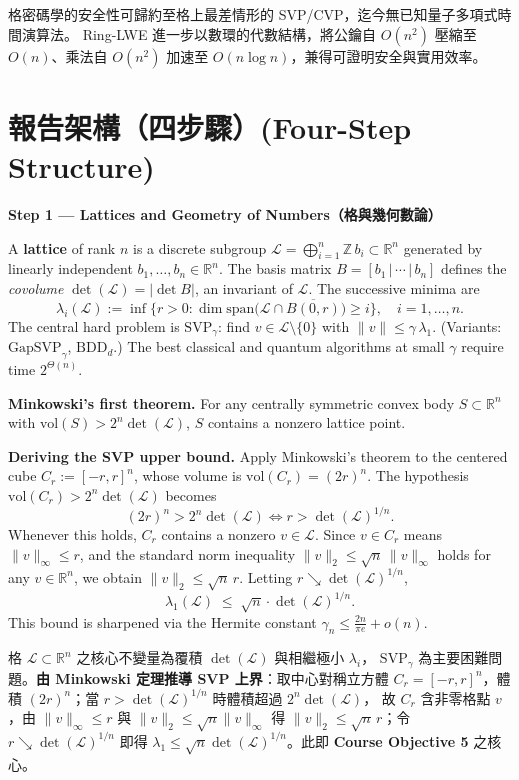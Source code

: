 \documentclass[12pt, a4paper]{article}
\begin{document}
格密碼學的安全性可歸約至格上最差情形的 SVP/CVP，迄今無已知量子多項式時間演算法。
Ring-LWE 進一步以數環的代數結構，將公鑰自 $O(n^2)$ 壓縮至 $O(n)$、乘法自 $O(n^2)$
加速至 $O(n\log n)$，兼得可證明安全與實用效率。

\section{報告架構（四步驟）\small\normalfont\color{gray}(Four-Step Structure)}

\textbf{Step 1 --- Lattices and Geometry of Numbers（格與幾何數論）}

A \textbf{lattice} of rank $n$ is a discrete subgroup
$\mathcal{L} = \bigoplus_{i=1}^{n}\mathbb{Z}\,b_i \subset \mathbb{R}^n$
generated by linearly independent $b_1,\ldots,b_n\in\mathbb{R}^n$. The basis matrix
$B=[b_1\,|\,\cdots\,|\,b_n]$ defines the \textit{covolume} $\det(\mathcal{L})=|\det B|$,
an invariant of $\mathcal{L}$. The successive minima are
\[
  \lambda_i(\mathcal{L}) := \inf\bigl\{r>0 : \dim\mathrm{span}\bigl(\mathcal{L}\cap\overline{B(0,r)}\bigr)\geq i\bigr\}, \quad i=1,\ldots,n.
\]
The central hard problem is $\mathrm{SVP}_\gamma$: find $v\in\mathcal{L}\setminus\{0\}$ with
$\|v\|\leq\gamma\,\lambda_1$. (Variants: $\mathrm{GapSVP}_\gamma$, $\mathrm{BDD}_d$.) The best
classical and quantum algorithms at small $\gamma$ require time $2^{\Theta(n)}$.

\textbf{Minkowski's first theorem.} For any centrally symmetric convex body $S\subset\mathbb{R}^n$
with $\mathrm{vol}(S)>2^n\det(\mathcal{L})$, $S$ contains a nonzero lattice point.

\textbf{Deriving the SVP upper bound.} Apply Minkowski's theorem to the centered cube
$C_r := [-r,r]^n$, whose volume is $\mathrm{vol}(C_r)=(2r)^n$. The hypothesis
$\mathrm{vol}(C_r)>2^n\det(\mathcal{L})$ becomes
\[
  (2r)^n > 2^n\det(\mathcal{L}) \iff r > \det(\mathcal{L})^{1/n}.
\]
Whenever this holds, $C_r$ contains a nonzero $v\in\mathcal{L}$. Since $v\in C_r$ means
$\|v\|_\infty\leq r$, and the standard norm inequality $\|v\|_2\leq\sqrt{n}\,\|v\|_\infty$ holds
for any $v\in\mathbb{R}^n$, we obtain $\|v\|_2\leq\sqrt{n}\,r$. Letting
$r\searrow\det(\mathcal{L})^{1/n}$,
\[
  \boxed{\ \lambda_1(\mathcal{L}) \;\leq\; \sqrt{n}\cdot\det(\mathcal{L})^{1/n}.\ }
\]
This bound is sharpened via the Hermite constant $\gamma_n\leq\tfrac{2n}{\pi e}+o(n)$.

格 $\mathcal{L}\subset\mathbb{R}^n$ 之核心不變量為覆積 $\det(\mathcal{L})$ 與相繼極小 $\lambda_i$，
$\mathrm{SVP}_\gamma$ 為主要困難問題。\textbf{由 Minkowski 定理推導 SVP 上界}：取中心對稱立方體
$C_r=[-r,r]^n$，體積 $(2r)^n$；當 $r>\det(\mathcal{L})^{1/n}$ 時體積超過 $2^n\det(\mathcal{L})$，
故 $C_r$ 含非零格點 $v$，由 $\|v\|_\infty\leq r$ 與 $\|v\|_2\leq\sqrt{n}\|v\|_\infty$ 得
$\|v\|_2\leq\sqrt{n}\,r$；令 $r\searrow\det(\mathcal{L})^{1/n}$ 即得
$\lambda_1\leq\sqrt{n}\det(\mathcal{L})^{1/n}$。此即 \textbf{Course Objective 5} 之核心。
\end{document}
